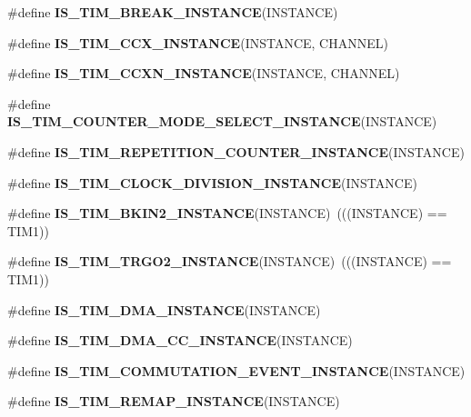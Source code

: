 \begin{DoxyCompactItemize}
\item 
\#define {\bfseries I\+S\+\_\+\+T\+I\+M\+\_\+\+B\+R\+E\+A\+K\+\_\+\+I\+N\+S\+T\+A\+N\+CE}(I\+N\+S\+T\+A\+N\+CE)
\item 
\#define {\bfseries I\+S\+\_\+\+T\+I\+M\+\_\+\+C\+C\+X\+\_\+\+I\+N\+S\+T\+A\+N\+CE}(I\+N\+S\+T\+A\+N\+CE,  C\+H\+A\+N\+N\+EL)
\item 
\#define {\bfseries I\+S\+\_\+\+T\+I\+M\+\_\+\+C\+C\+X\+N\+\_\+\+I\+N\+S\+T\+A\+N\+CE}(I\+N\+S\+T\+A\+N\+CE,  C\+H\+A\+N\+N\+EL)
\item 
\#define {\bfseries I\+S\+\_\+\+T\+I\+M\+\_\+\+C\+O\+U\+N\+T\+E\+R\+\_\+\+M\+O\+D\+E\+\_\+\+S\+E\+L\+E\+C\+T\+\_\+\+I\+N\+S\+T\+A\+N\+CE}(I\+N\+S\+T\+A\+N\+CE)
\item 
\#define {\bfseries I\+S\+\_\+\+T\+I\+M\+\_\+\+R\+E\+P\+E\+T\+I\+T\+I\+O\+N\+\_\+\+C\+O\+U\+N\+T\+E\+R\+\_\+\+I\+N\+S\+T\+A\+N\+CE}(I\+N\+S\+T\+A\+N\+CE)
\item 
\#define {\bfseries I\+S\+\_\+\+T\+I\+M\+\_\+\+C\+L\+O\+C\+K\+\_\+\+D\+I\+V\+I\+S\+I\+O\+N\+\_\+\+I\+N\+S\+T\+A\+N\+CE}(I\+N\+S\+T\+A\+N\+CE)
\item 
\mbox{\label{group___exported__macro_ga64ee0eb39ee44221618c397a8f74c7b8}} 
\#define {\bfseries I\+S\+\_\+\+T\+I\+M\+\_\+\+B\+K\+I\+N2\+\_\+\+I\+N\+S\+T\+A\+N\+CE}(I\+N\+S\+T\+A\+N\+CE)~(((I\+N\+S\+T\+A\+N\+CE) == T\+I\+M1))
\item 
\mbox{\label{group___exported__macro_ga68305c0173caf4e109020403624d252f}} 
\#define {\bfseries I\+S\+\_\+\+T\+I\+M\+\_\+\+T\+R\+G\+O2\+\_\+\+I\+N\+S\+T\+A\+N\+CE}(I\+N\+S\+T\+A\+N\+CE)~(((I\+N\+S\+T\+A\+N\+CE) == T\+I\+M1))
\item 
\#define {\bfseries I\+S\+\_\+\+T\+I\+M\+\_\+\+D\+M\+A\+\_\+\+I\+N\+S\+T\+A\+N\+CE}(I\+N\+S\+T\+A\+N\+CE)
\item 
\#define {\bfseries I\+S\+\_\+\+T\+I\+M\+\_\+\+D\+M\+A\+\_\+\+C\+C\+\_\+\+I\+N\+S\+T\+A\+N\+CE}(I\+N\+S\+T\+A\+N\+CE)
\item 
\#define {\bfseries I\+S\+\_\+\+T\+I\+M\+\_\+\+C\+O\+M\+M\+U\+T\+A\+T\+I\+O\+N\+\_\+\+E\+V\+E\+N\+T\+\_\+\+I\+N\+S\+T\+A\+N\+CE}(I\+N\+S\+T\+A\+N\+CE)
\item 
\#define {\bfseries I\+S\+\_\+\+T\+I\+M\+\_\+\+R\+E\+M\+A\+P\+\_\+\+I\+N\+S\+T\+A\+N\+CE}(I\+N\+S\+T\+A\+N\+CE)
\item 
\mbox{\label{group___exported__macro_gaf29af2609f6b7748104a965262e95475}} 

\end{DoxyCompactItemize}
